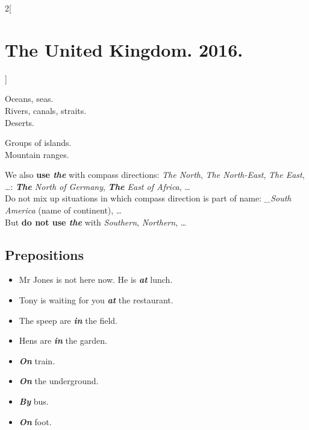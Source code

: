 \documentclass[10pt,a4paper]{article}
\newlength{\OriginalParIndent}
\newcommand\ex[1]{\textit{\textbf{{#1}}}}           %
\newcommand\za{\_\thinspace }                       %
\newenvironment{ItemizeWithOrigParIndent}
    {\begin{itemize}[leftmargin=\OriginalParIndent]}
    {\end{itemize}}
\begin{document}
\begin{multicols}{2}[\section{The United Kingdom. 2016.}]
\hspace{\OriginalParIndent}\begin{minipage}{0.55\linewidth}
Oceans, seas.\\
Rivers, canals, straits.\\
Deserts.
\end{minipage}
\begin{minipage}{0.3\linewidth}
Groups of islands.\\
Mountain ranges.
\end{minipage}\vspace{\parskip}

We also \textbf{use \ex{the}} with compass directions: \textit{The North}, \textit{The North-East},
\textit{The East}, \dots: \textit{\ex{The} North of Germany}, \textit{\ex{The} East of Africa}, \dots\\
Do not mix up situations in which compass direction is part of name:
\textit{\za South America} (name of continent), \dots\\
But \textbf{do not use \ex{the}} with \textit{Southern}, \textit{Northern}, \dots







\subsection{Prepositions}

\begin{ItemizeWithOrigParIndent}
  \item Mr Jones is not here now. He is \ex{at} lunch.
  \item Tony is waiting for you \ex{at} the restaurant.
  \item The speep are \ex{in} the field.
  \item Hens are \ex{in} the garden.
\end{ItemizeWithOrigParIndent}

\begin{ItemizeWithOrigParIndent}
  \item \ex{On} train.
  \item \ex{On} the underground.
  \item \ex{By} bus.
  \item \ex{On} foot.
\end{ItemizeWithOrigParIndent}







\end{multicols}
\end{document}
